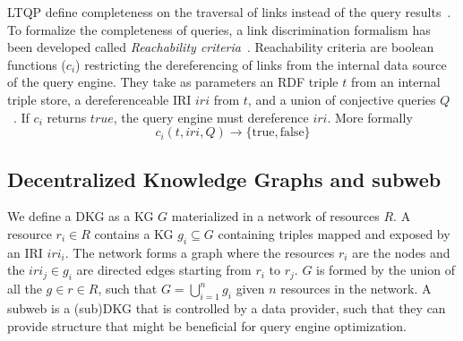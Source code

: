 LTQP define completeness on the traversal of links instead of the query results~\cite{Hartig2012}.
To formalize the completeness of queries, a link discrimination formalism has been developed called \emph{Reachability criteria}~\cite{Hartig2012}.
Reachability criteria are boolean functions ($c_i$) restricting the dereferencing of links from the internal data source of the query engine.
They take as parameters an RDF triple $t$ from an internal triple store, a dereferenceable IRI $iri$ from $t$, and a union of conjective queries $Q$~\cite{Hartig2012}.
If $c_i$ returns $true$, the query engine must dereference $iri$.
More formally
\begin{equation}\label{eq:reachabilityCriteria}
c_i(t, iri, Q) \rightarrow \{\mathrm{true}, \mathrm{false}\}
\end{equation}

\subsection{Decentralized Knowledge Graphs and subweb}\label{sec:dkg}

We define a DKG as a KG $G$ materialized in a network of resources $R$.
A resource $r_i \in R$ contains a KG $g_i \subseteq G$ containing triples mapped and exposed by an IRI $iri_i$.
The network forms a graph where the resources $r_i$ are the nodes and the $iri_j \in g_i$ are directed edges starting from $r_i$ to $r_j$.
$G$ is formed by the union of all the $g \in r \in R$, such that $G = \bigcup_{i=1}^{n}g_i$ given $n$ resources in the network.
A subweb is a (sub)DKG that is controlled by a data provider, such that they can provide structure that might be beneficial for query engine optimization.